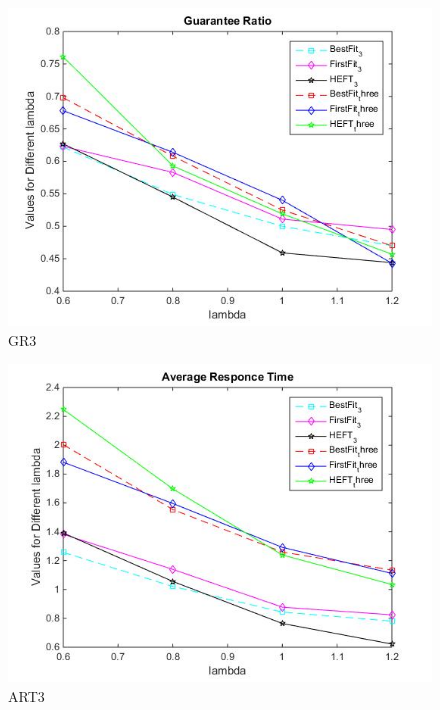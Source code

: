 \documentclass[conference]{IEEEtran}
\begin{document}

\begin{figure}[htbp]
\includegraphics[scale=0.45]{gr_3_p.jpg}
\caption{GR3}
\label{fig}
\end{figure}


\begin{figure}[htbp]
\includegraphics[scale=0.45]{art_3_p.jpg}
\caption{ART3}
\label{fig}
\end{figure}
\end{document}
